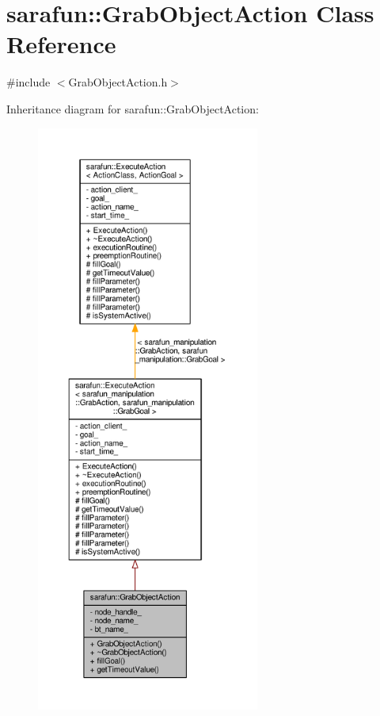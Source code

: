 \hypertarget{classsarafun_1_1GrabObjectAction}{\section{sarafun\-:\-:Grab\-Object\-Action Class Reference}
\label{classsarafun_1_1GrabObjectAction}
}


{\ttfamily \#include $<$Grab\-Object\-Action.\-h$>$}



Inheritance diagram for sarafun\-:\-:Grab\-Object\-Action\-:
\nopagebreak
\begin{figure}[H]
\begin{center}
\leavevmode
\includegraphics[height=550pt]{db/dc6/classsarafun_1_1GrabObjectAction__inherit__graph}
\end{center}
\end{figure}


